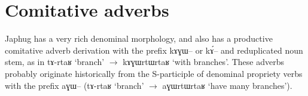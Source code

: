 \documentclass[oldfontcommands,oneside,a4paper,11pt]{article}
\newcommand{\ipa}[1]{{\phon #1}} %
\begin{document}
\section{Comitative adverbs}
Japhug has a very rich denominal morphology, and also has a productive comitative adverb derivation with the prefix \ipa{kɤɣɯ--} or \ipa{kɤ́--} and reduplicated noun stem, as in \ipa{tɤ-rtaʁ} `branch' $\rightarrow$ \ipa{kɤɣɯrtɯrtaʁ} `with branches'. These adverbs probably originate historically from the S-participle of denominal propriety verbs with the prefix \ipa{aɣɯ--} (\ipa{tɤ-rtaʁ} `branch' $\rightarrow$ \ipa{aɣɯrtɯrtaʁ} `have many branches').



\end{document}
